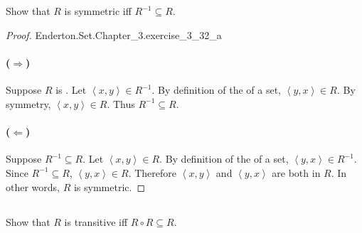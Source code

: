 \documentclass{report}
\newcommand{\pair}[1]{\left< #1 \right>}
\begin{document}
\subsection{}%

Show that $R$ is symmetric iff $R^{-1} \subseteq R$.

\begin{proof}

    {Enderton.Set.Chapter\_3.exercise\_3\_32\_a}

  \paragraph{($\Rightarrow$)}%

    Suppose $R$ is .
    Let $\pair{x, y} \in R^{-1}$.
    By definition of the  of a set,
      $\pair{y, x} \in R$.
    By symmetry, $\pair{x, y} \in R$.
    Thus $R^{-1} \subseteq R$.

  \paragraph{($\Leftarrow$)}%

    Suppose $R^{-1} \subseteq R$.
    Let $\pair{x, y} \in R$.
    By definition of the  of a set,
      $\pair{y, x} \in R^{-1}$.
    Since $R^{-1} \subseteq R$, $\pair{y, x} \in R$.
    Therefore $\pair{x, y}$ and $\pair{y, x}$ are both in $R$.
    In other words, $R$ is symmetric.

\end{proof}

\subsection{}%

Show that $R$ is transitive iff $R \circ R \subseteq R$.
\end{document}
